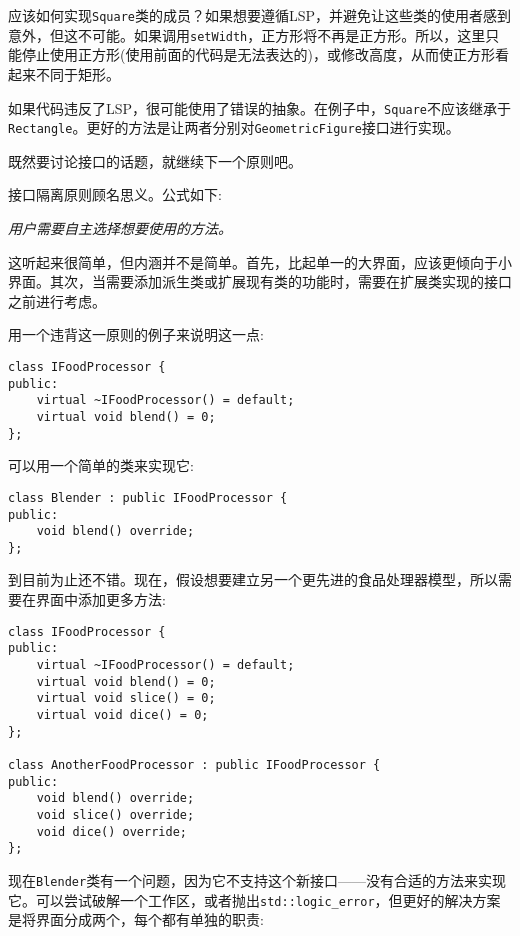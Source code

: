 应该如何实现\texttt{Square}类的成员？如果想要遵循LSP，并避免让这些类的使用者感到意外，但这不可能。如果调用\texttt{setWidth}，正方形将不再是正方形。所以，这里只能停止使用正方形(使用前面的代码是无法表达的)，或修改高度，从而使正方形看起来不同于矩形。

如果代码违反了LSP，很可能使用了错误的抽象。在例子中，\texttt{Square}不应该继承于\texttt{Rectangle}。更好的方法是让两者分别对\texttt{GeometricFigure}接口进行实现。

既然要讨论接口的话题，就继续下一个原则吧。


接口隔离原则顾名思义。公式如下:

\noindent
\hspace*{0.8cm}\textit{用户需要自主选择想要使用的方法。}

这听起来很简单，但内涵并不是简单。首先，比起单一的大界面，应该更倾向于小界面。其次，当需要添加派生类或扩展现有类的功能时，需要在扩展类实现的接口之前进行考虑。

用一个违背这一原则的例子来说明这一点:

\begin{lstlisting}[style=styleCXX]
class IFoodProcessor {
public:
	virtual ~IFoodProcessor() = default;
	virtual void blend() = 0;
};
\end{lstlisting}

可以用一个简单的类来实现它:

\begin{lstlisting}[style=styleCXX]
class Blender : public IFoodProcessor {
public:
	void blend() override;
};
\end{lstlisting}

到目前为止还不错。现在，假设想要建立另一个更先进的食品处理器模型，所以需要在界面中添加更多方法:

\begin{lstlisting}[style=styleCXX]
class IFoodProcessor {
public:
	virtual ~IFoodProcessor() = default;
	virtual void blend() = 0;
	virtual void slice() = 0;
	virtual void dice() = 0;
};

class AnotherFoodProcessor : public IFoodProcessor {
public:
	void blend() override;
	void slice() override;
	void dice() override;
};
\end{lstlisting}

现在\texttt{Blender}类有一个问题，因为它不支持这个新接口——没有合适的方法来实现它。可以尝试破解一个工作区，或者抛出\texttt{std::logic\_error}，但更好的解决方案是将界面分成两个，每个都有单独的职责:


